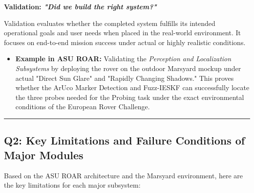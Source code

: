 \documentclass[12pt,a4paper]{article}
\begin{document}
\noindent\textbf{Validation: \textit{"Did we build the right system?"}}

Validation evaluates whether the completed system fulfills its intended operational goals and user needs when placed in the real-world environment. It focuses on end-to-end mission success under actual or highly realistic conditions.

\begin{itemize}[leftmargin=*]
    \item \textbf{Example in ASU ROAR:} Validating the \textit{Perception and Localization Subsystems} by deploying the rover on the outdoor Marsyard mockup under actual "Direct Sun Glare" and "Rapidly Changing Shadows." This proves whether the ArUco Marker Detection and Fuzz-IESKF can successfully locate the three probes needed for the Probing task under the exact environmental conditions of the European Rover Challenge.
\end{itemize}

\vspace{0.3em}
\noindent\rule{\textwidth}{0.4pt}
\vspace{0.3em}

\subsection{Q2: Key Limitations and Failure Conditions of Major Modules}

Based on the ASU ROAR architecture and the Marsyard environment, here are the key limitations for each major subsystem:
\end{document}
